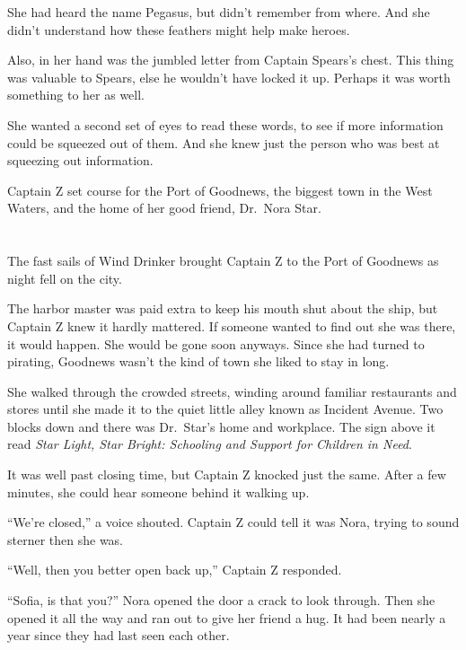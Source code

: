 \documentclass[12pt]{extbook}
\begin{document}
  She had heard the name Pegasus, but didn't remember from where. And she
  didn't understand how these feathers might help make heroes.
  
  Also, in her hand was the jumbled letter from Captain Spears's chest.
  This thing was valuable to Spears, else he wouldn't have locked it up.
  Perhaps it was worth something to her as well.
  
  She wanted a second set of eyes to read these words, to see if more
  information could be squeezed out of them. And she knew just the person
  who was best at squeezing out information.
  
  Captain Z set course for the Port of Goodnews, the biggest town in the
  West Waters, and the home of her good friend, Dr.~Nora Star.
  
  \section{}\label{section-25}
  
  The fast sails of Wind Drinker brought Captain Z to the Port of Goodnews
  as night fell on the city.
  
  The harbor master was paid extra to keep his mouth shut about the ship,
  but Captain Z knew it hardly mattered. If someone wanted to find out she
  was there, it would happen. She would be gone soon anyways. Since she
  had turned to pirating, Goodnews wasn't the kind of town she liked to
  stay in long.
  
  She walked through the crowded streets, winding around familiar
  restaurants and stores until she made it to the quiet little alley known
  as Incident Avenue. Two blocks down and there was Dr.~Star's home and
  workplace. The sign above it read \emph{Star Light, Star Bright:
  Schooling and Support for Children in Need}.
  
  It was well past closing time, but Captain Z knocked just the same.
  After a few minutes, she could hear someone behind it walking up.
  
  \enquote{We're closed,} a voice shouted. Captain Z could tell it was
  Nora, trying to sound sterner then she was.
  
  \enquote{Well, then you better open back up,} Captain Z responded.
  
  \enquote{Sofia, is that you?} Nora opened the door a crack to look
  through. Then she opened it all the way and ran out to give her friend a
  hug. It had been nearly a year since they had last seen each other.
  
\end{document}
